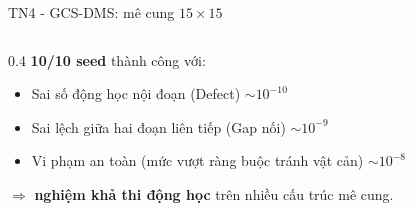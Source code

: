 \documentclass[aspectratio=169]{beamer}
\begin{document}
\begin{frame}{TN4 - GCS-DMS: mê cung $15\!\times\!15$}
\begin{columns}[T,onlytextwidth]
\begin{column}{0.4\textwidth}
            \vspace{0.4em}
            \footnotesize \textbf{10/10 seed} thành công với:
            \begin{itemize}\itemsep0pt
                \item Sai số động học nội đoạn (Defect) $\sim 10^{-10}$
                \item Sai lệch giữa hai đoạn liên tiếp (Gap nối) $\sim 10^{-9}$
                \item Vi phạm an toàn (mức vượt ràng buộc tránh vật cản) $\sim 10^{-8}$
            \end{itemize}
            $\Rightarrow$ \textbf{nghiệm khả thi động học} trên nhiều cấu trúc mê cung.
        \end{column}
    \end{columns}
\end{frame}
\end{document}

